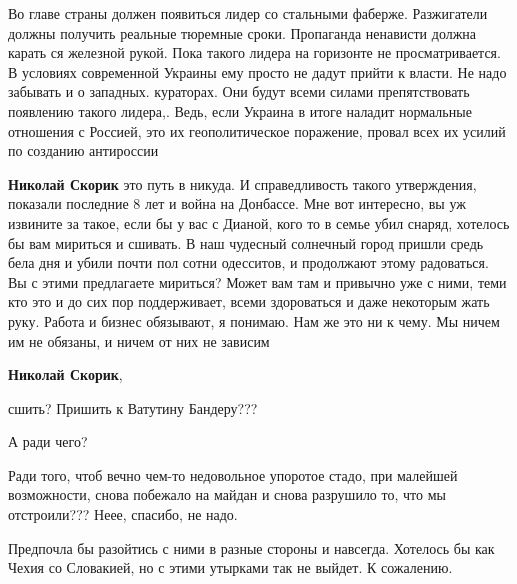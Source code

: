 \begin{itemize}
\begin{itemize}
Во главе страны должен появиться лидер со стальными фаберже. Разжигатели
должны получить реальные тюремные сроки. Пропаганда ненависти должна карать ся
железной рукой. Пока такого лидера на горизонте не просматривается. В условиях
современной Украины ему просто не дадут прийти к власти. Не надо забывать и о
западных. кураторах. Они будут всеми силами препятствовать появлению такого
лидера,. Ведь, если Украина в итоге наладит нормальные отношения с Россией, это
их геополитическое поражение, провал всех их усилий по созданию антироссии

 
\textbf{Николай Скорик} это путь в никуда. И справедливость такого утверждения,
показали последние 8 лет и война на Донбассе. Мне вот интересно, вы уж извините
за такое, если бы у вас с Дианой, кого то в семье убил снаряд, хотелось бы вам
мириться и сшивать. В наш чудесный солнечный город пришли средь бела дня и
убили почти пол сотни одесситов, и продолжают этому радоваться. Вы с этими
предлагаете мириться? Может вам там и привычно уже с ними, теми кто это и до
сих пор поддерживает, всеми здороваться и даже некоторым жать руку. Работа и
бизнес обязывают, я понимаю. Нам же это ни к чему. Мы ничем им не обязаны, и
ничем от них не зависим

 
\textbf{Николай Скорик},

сшить? Пришить к Ватутину Бандеру???

А ради чего?

Ради того, чтоб вечно чем-то недовольное упоротое стадо, при малейшей
возможности, снова побежало на майдан и снова разрушило то, что мы отстроили???
Неее, спасибо, не надо.

Предпочла бы разойтись с ними в разные стороны и навсегда. Хотелось бы как
Чехия со Словакией, но с этими утырками так не выйдет. К сожалению.


 

\end{itemize}
\end{itemize}
